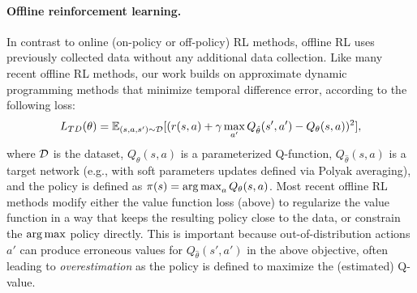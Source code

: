 \documentclass{article} %
\begin{document}
\paragraph{Offline reinforcement learning.} In contrast to online (on-policy or off-policy) RL methods, offline RL uses previously collected data without any additional data collection. Like many recent offline RL methods, our work builds on approximate dynamic programming methods that minimize temporal difference error, according to the following loss:
\vspace{-0.1cm}
\begin{equation}
L_{TD}(\theta) = \E_{(s, a, s')\sim\D}[(r(s,a) + \gamma \max_{a'}Q_{\hat{\theta}}(s',a') - Q_\theta(s,a))^2],
\label{eqn:td}
\vspace{-0.2cm}
\end{equation}
where $\mathcal{D}$ is the dataset,
$Q_\theta(s,a)$ is a parameterized Q-function, $Q_{\hat{\theta}}(s,a)$ is a target network (e.g., with soft parameters updates defined via Polyak averaging), and the policy is defined as $\pi(s) = \operatorname*{arg\,max}_a Q_\theta(s,a)$. Most recent offline RL methods modify either the value function loss (above) to regularize the value function in a way that keeps the resulting policy close to the data, or constrain the $\operatorname*{arg\,max}$ policy directly. This is important because out-of-distribution actions $a'$ can produce erroneous values for $Q_{\hat{\theta}}(s',a')$ in the above objective, often leading to \emph{overestimation} as the policy is defined to maximize the (estimated) Q-value.
\end{document}

